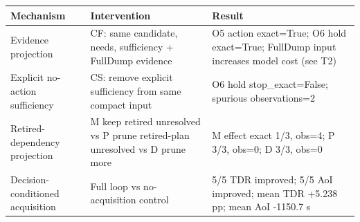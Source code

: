 \begin{tabular}{p{}p{}p{}}
\toprule
Mechanism & Intervention & Result \\
\midrule
Evidence projection & CF: same candidate, needs, sufficiency + FullDump evidence & O5 action exact=True; O6 hold exact=True; FullDump input increases model cost (see T2) \\
Explicit no-action sufficiency & CS: remove explicit sufficiency from same compact input & O6 hold stop\_exact=False; spurious observations=2 \\
Retired-dependency projection & M keep retired unresolved vs P prune retired-plan unresolved vs D prune more & M effect exact 1/3, obs=4; P 3/3, obs=0; D 3/3, obs=0 \\
Decision-conditioned acquisition & Full loop vs no-acquisition control & 5/5 TDR improved; 5/5 AoI improved; mean TDR +5.238 pp; mean AoI -1150.7 s \\
\bottomrule
\end{tabular}
